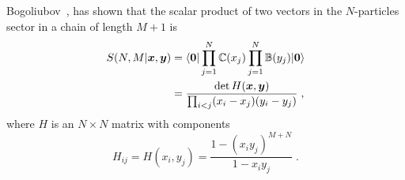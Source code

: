 \documentclass[a4paper,11pt]{amsart}
\begin{document}
Bogoliubov~\cite{Bogoliubov2005}, has shown that the scalar product of
two vectors in the \(N\)-particles sector in a chain of length \(M+1\)
is
\begin{equation}
\begin{split}
\label{eq:scalar}
  S(N, M|\bm{x}, \bm{y}) & =
  \langle\bm{0}\rvert \prod_{j=1}^N \mathbb{C}(x_j) \prod_{j=1}^N \mathbb{B}(y_j) \lvert\bm{0}\rangle \\ 
 & = \frac{ \det H(\bm{x},\bm{y})}{ \prod_{i<j}(x_i - x_j)(y_i - y_j)} \; ,
\end{split}
\end{equation}
where \(H\) is an \(N\times N\) matrix with components
\begin{equation}
\label{eq:h-matrix}
  H_{ij} = H(x_i, y_j) 
  =\frac{1 - (x_i y_j)^{ M + N}}{1 - x_i y_j }\; .
\end{equation}

\end{document}
